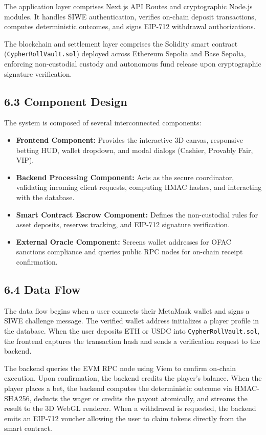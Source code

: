 The application layer comprises Next.js API Routes and cryptographic Node.js modules. It handles SIWE authentication, verifies on-chain deposit transactions, computes deterministic outcomes, and signs EIP-712 withdrawal authorizations.

The blockchain and settlement layer comprises the Solidity smart contract (\texttt{CypherRollVault.sol}) deployed across Ethereum Sepolia and Base Sepolia, enforcing non-custodial custody and autonomous fund release upon cryptographic signature verification.

\subsection*{6.3 Component Design}
The system is composed of several interconnected components:
\begin{itemize}[leftmargin=1.5em]
    \item \textbf{Frontend Component:} Provides the interactive 3D canvas, responsive betting HUD, wallet dropdown, and modal dialogs (Cashier, Provably Fair, VIP).
    \item \textbf{Backend Processing Component:} Acts as the secure coordinator, validating incoming client requests, computing HMAC hashes, and interacting with the database.
    \item \textbf{Smart Contract Escrow Component:} Defines the non-custodial rules for asset deposits, reserves tracking, and EIP-712 signature verification.
    \item \textbf{External Oracle Component:} Screens wallet addresses for OFAC sanctions compliance and queries public RPC nodes for on-chain receipt confirmation.
\end{itemize}

\subsection*{6.4 Data Flow}
The data flow begins when a user connects their MetaMask wallet and signs a SIWE challenge message. The verified wallet address initializes a player profile in the database. When the user deposits ETH or USDC into \texttt{CypherRollVault.sol}, the frontend captures the transaction hash and sends a verification request to the backend.

The backend queries the EVM RPC node using Viem to confirm on-chain execution. Upon confirmation, the backend credits the player's balance. When the player places a bet, the backend computes the deterministic outcome via HMAC-SHA256, deducts the wager or credits the payout atomically, and streams the result to the 3D WebGL renderer. When a withdrawal is requested, the backend emits an EIP-712 voucher allowing the user to claim tokens directly from the smart contract.

